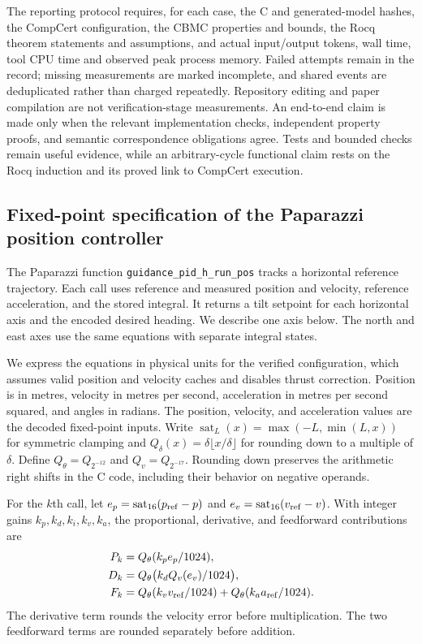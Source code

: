 \documentclass[manuscript, screen, review]{acmart}
\begin{document}
The reporting protocol requires, for each case, the C and generated-model hashes, the
CompCert configuration, the CBMC properties and bounds, the Rocq theorem
statements and assumptions, and actual input/output tokens, wall time, tool CPU time and observed peak
process memory. Failed attempts remain in the record; missing measurements
are marked incomplete, and shared events are deduplicated rather than
charged repeatedly. Repository editing and paper compilation are not
verification-stage measurements. An end-to-end claim
is made only when the relevant implementation checks, independent property
proofs, and semantic correspondence obligations agree. Tests and bounded
checks remain useful evidence, while an arbitrary-cycle functional claim
rests on the Rocq induction and its proved link to CompCert execution.

\subsection{Fixed-point specification of the Paparazzi position controller}
\label{sec:paparazzi-pid}

The Paparazzi function \texttt{guidance\_pid\_h\_run\_pos} tracks a
horizontal reference trajectory. Each call uses reference and measured
position and velocity, reference acceleration, and the stored integral.
It returns a tilt setpoint for each horizontal axis and the encoded
desired heading. We describe one axis below. The north and east axes
use the same equations with separate integral states.

We express the equations in physical units for the verified configuration,
which assumes valid position and velocity caches and disables thrust
correction. Position is in metres, velocity in metres per second,
acceleration in metres per second squared, and angles in radians. The
position, velocity, and acceleration values are the decoded fixed-point
inputs. Write $\operatorname{sat}_L(x)=\max(-L,\min(L,x))$ for symmetric
clamping and $Q_\delta(x)=\delta\lfloor x/\delta\rfloor$ for rounding
down to a multiple of $\delta$. Define
$Q_\theta=Q_{2^{-12}}$ and $Q_v=Q_{2^{-17}}$. Rounding down preserves
the arithmetic right shifts in the C code, including their behavior on
negative operands.

For the $k$th call, let $e_p=\operatorname{sat}_{16}(p_{\rm ref}-p)$ and
$e_v=\operatorname{sat}_{16}(v_{\rm ref}-v)$. With integer gains
$k_p,k_d,k_i,k_v,k_a$, the proportional, derivative, and feedforward
contributions are
\begin{align}
 P_k &= Q_\theta(k_p e_p/1024),\\
 D_k &= Q_\theta\bigl(k_d Q_v(e_v)/1024\bigr),\\
 F_k &= Q_\theta(k_v v_{\rm ref}/1024)
       + Q_\theta(k_a a_{\rm ref}/1024).
\end{align}
The derivative term rounds the velocity error before multiplication.
The two feedforward terms are rounded separately before addition.
\end{document}
